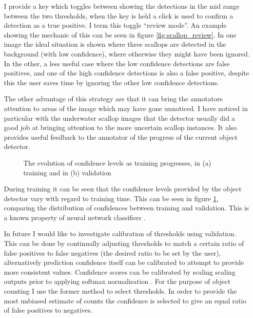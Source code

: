 I provide a key which toggles between showing the detections in the mid range between the two thresholds, when the key is held a click is used to confirm a detection as a true positive. I term this toggle ``review mode''.  An example showing the mechanic of this can be seen in figure \ref{fig:scallop_review}. In one image the ideal situation is shown where three scallops are detected in the background (with low confidence), where otherwise they might have been ignored. In the other, a less useful case where the low confidence detections are false positives, and one of the high confidence detections is also a false positive, despite this the user saves time by ignoring the other low confidence detections.

The other advantage of this strategy are that it can bring the annotators attention to areas of the image which may have gone unnoticed. I have noticed in particular with the underwater scallop images that the detector usually did a good job at bringing attention to the more uncertain scallop instances. It also provides useful feedback to the annotator of the progress of the current object detector. 




\begin{figure}[h]
\centering


\caption{ The evolution of confidence levels as training progresses, in (a) training and in (b) validation }
\label {fig:confidence}
\end{figure}

During training it can be seen that the confidence levels provided by the object detector vary with regard to training time. This can be seen in figure \ref{fig:confidence}, comparing the distribution of confidences between training and validation. This is a known property of neural network classifiers \cite{Guo2017}.

In future I would like to investigate calibration of thresholds using validation. This can be done by continually adjusting thresholds to match a certain ratio of false positives to false negatives (the desired ratio to be set by the user), alternatively prediction confidence itself can be calibrated to attempt to provide more consistent values. Confidence scores can be calibrated by scaling scaling outputs prior to applying softmax normalisation \cite{Guo2017}. For the purpose of object counting I use the former method to select thresholds. In order to provide the most unbiased estimate of counts the confidence is selected to give an equal ratio of false positives to negatives.


